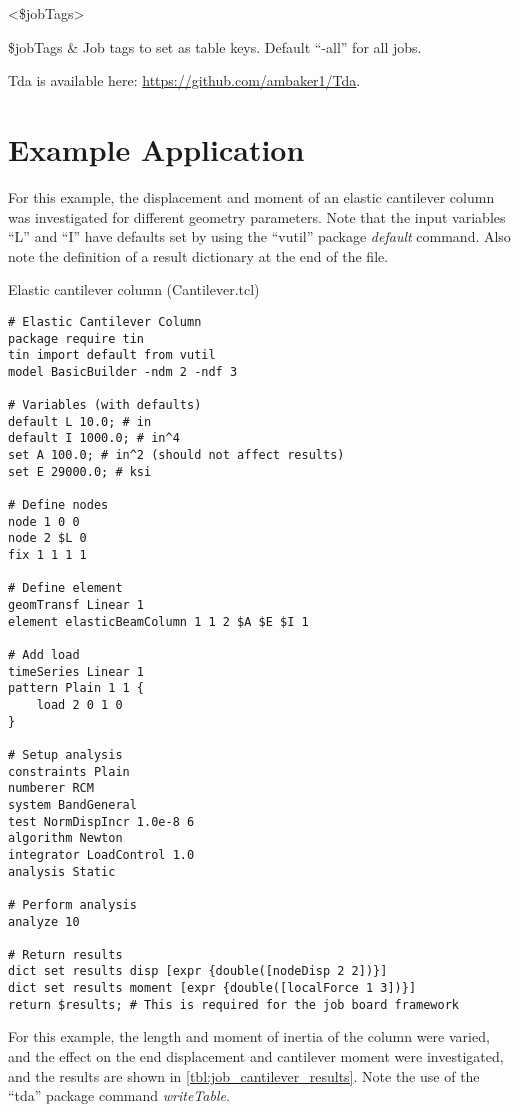\documentclass{article}
\renewcommand{\^}[1]{\textsuperscript{#1}}
\renewcommand{\_}[1]{\textsubscript{#1}}
\begin{document}
\begin{syntax}
 <\$jobTags>
\end{syntax}
\begin{args}
\$jobTags & Job tags to set as table keys. Default ``-all'' for all jobs.
\end{args}

Tda is available here: \url{https://github.com/ambaker1/Tda}.

\clearpage
\section{Example Application}
For this example, the displacement and moment of an elastic cantilever column was investigated for different geometry parameters. 
Note that the input variables ``L'' and ``I'' have defaults set by using the ``vutil'' package \textit{default} command. Also note the definition of a result dictionary at the end of the file.
\begin{example}[label=ex:job_cantilever]{Elastic cantilever column (Cantilever.tcl)}
\begin{lstlisting}
# Elastic Cantilever Column
package require tin
tin import default from vutil
model BasicBuilder -ndm 2 -ndf 3

# Variables (with defaults)
default L 10.0; # in
default I 1000.0; # in^4
set A 100.0; # in^2 (should not affect results)
set E 29000.0; # ksi

# Define nodes
node 1 0 0
node 2 $L 0
fix 1 1 1 1

# Define element
geomTransf Linear 1
element elasticBeamColumn 1 1 2 $A $E $I 1

# Add load
timeSeries Linear 1
pattern Plain 1 1 {
    load 2 0 1 0
}

# Setup analysis
constraints Plain
numberer RCM
system BandGeneral
test NormDispIncr 1.0e-8 6 
algorithm Newton
integrator LoadControl 1.0
analysis Static

# Perform analysis
analyze 10

# Return results
dict set results disp [expr {double([nodeDisp 2 2])}]
dict set results moment [expr {double([localForce 1 3])}]
return $results; # This is required for the job board framework
\end{lstlisting}
\end{example}
For this example, the length and moment of inertia of the column were varied, and the effect on the end displacement and cantilever moment were investigated, and the results are shown in \tbl\ref{tbl:job_cantilever_results}. Note the use of the ``tda'' package command \textit{writeTable}.
\end{document}
